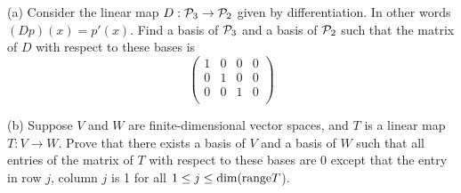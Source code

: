 \begin{question}

\normalfont
(a) Consider the linear map $D: \P_3 \to \P_2$ given by differentiation. In other words $(Dp)(x) = p'(x)$. Find a basis of $\P_3$ and a basis of $\P_2$ such that the matrix of $D$ with respect to these bases is 
\[
\left( \begin{array}{rrrr}
1 & 0 & 0 & 0 \\
0 & 1 & 0 & 0 \\
0 & 0 & 1 & 0 \\
\end{array}\right)
\]


\vspace{.4cm}

\noindent (b) Suppose $V$ and $W$ are finite-dimensional vector spaces, and $T$ is a linear map $T: V \to W$. Prove that there exists a basis of $V$ and a basis of $W$ such that all entries of the matrix of $T$ with respect to these bases are 0 except that the entry in row $j$, column $j$ is 1 for all $1\leq j \leq \dim (\textup{range} T$). 

\end{question}